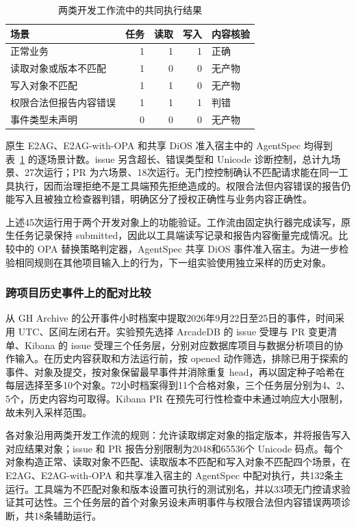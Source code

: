 \begin{table}[htbp]
\centering
\caption{两类开发工作流中的共同执行结果}
\label{tab:business-rr022}
\small
\begin{tabular}{p{50mm}rrrp{31mm}}
\toprule
场景 & 任务 & 读取 & 写入 & 内容核验 \\
\midrule
正常业务 & 1 & 1 & 1 & 正确 \\
读取对象或版本不匹配 & 1 & 0 & 0 & 无产物 \\
写入对象不匹配 & 1 & 1 & 0 & 无产物 \\
权限合法但报告内容错误 & 1 & 1 & 1 & 判错 \\
事件类型未声明 & 0 & 0 & 0 & 无产物 \\
\bottomrule
\end{tabular}
\end{table}

原生 E2AG、E2AG-with-OPA 和共享 DiOS 准入宿主中的 AgentSpec 均得到表~\ref{tab:business-rr022} 的逐场景计数。issue 另含超长、错误类型和 Unicode 诊断控制，总计九场景、27次运行；PR 为六场景、18次运行。无门控控制确认不匹配请求能在同一工具执行，因而治理拒绝不是工具端预先拒绝造成的。权限合法但内容错误的报告仍能写入且被独立检查器判错，明确区分了授权正确性与业务内容正确性。

上述45次运行用于两个开发对象上的功能验证。工作流由固定执行器完成读写，原生任务记录保持 submitted，因此以工具端读写记录和报告内容衡量完成情况。比较中的 OPA 替换策略判定器，AgentSpec 共享 DiOS 事件准入宿主。为进一步检验相同规则在其他项目输入上的行为，下一组实验使用独立采样的历史对象。

\subsubsection{跨项目历史事件上的配对比较}
\label{sec:holdout-rr022}

从 GH Archive 的公开事件小时档案\cite{gharchive}中提取2026年9月22日至25日的事件，时间采用 UTC、区间左闭右开。实验预先选择 ArcadeDB 的 issue 受理与 PR 变更清单、Kibana 的 issue 受理三个任务层，分别对应数据库项目与数据分析项目的协作输入。在历史内容获取和方法运行前，按 opened 动作筛选，排除已用于探索的事件、对象及提交，按对象保留最早事件并消除重复 head，再以固定种子哈希在每层选择至多10个对象。72小时档案得到11个合格对象，三个任务层分别为4、2、5个，历史内容均可取得。Kibana PR 在预先可行性检查中未通过响应大小限制，故未列入采样范围。

各对象沿用两类开发工作流的规则：允许读取绑定对象的指定版本，并将报告写入对应结果对象；issue 和 PR 报告分别限制为2048和65536个 Unicode 码点。每个对象构造正常、读取对象不匹配、读取版本不匹配和写入对象不匹配四个场景，在 E2AG、E2AG-with-OPA 和共享准入宿主的 AgentSpec 中配对执行，共132条主运行。工具端为不匹配对象和版本设置可执行的测试别名，并以33项无门控请求验证其可达性。三个任务层的首个对象另设未声明事件与权限合法但内容错误两项诊断，共18条辅助运行。

